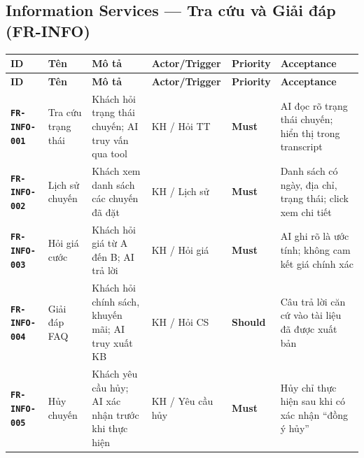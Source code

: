 \documentclass[12pt,a4paper]{article}
\newcommand{\reqid}[1]{\texttt{\textbf{\color{AloBlue}#1}}}
\newcommand{\musthave}{\colorbox{PrioMust}{\small\textbf{Must}}}
\newcommand{\shouldhave}{\colorbox{PrioShould}{\small\textbf{Should}}}
\begin{document}
\subsection{Information Services --- Tra cứu và Giải đáp (FR-INFO)}
\begin{longtable}{L{2.2cm} L{2.2cm} L{3.8cm} L{2.8cm} C{1.5cm} L{3cm}}
  \toprule{}\textbf{ID}&\textbf{Tên}&\textbf{Mô tả}&\textbf{Actor/Trigger}&\textbf{Priority}&\textbf{Acceptance}\\
  \midrule\endfirsthead\toprule{}\textbf{ID}&\textbf{Tên}&\textbf{Mô tả}&\textbf{Actor/Trigger}&\textbf{Priority}&\textbf{Acceptance}\\\midrule\endhead\bottomrule\endlastfoot
  \reqid{FR-INFO-001} & Tra cứu trạng thái & Khách hỏi trạng thái chuyến; AI truy vấn qua tool & KH / Hỏi TT & \musthave & AI đọc rõ trạng thái chuyến; hiển thị trong transcript \\
  \reqid{FR-INFO-002} & Lịch sử chuyến & Khách xem danh sách các chuyến đã đặt & KH / Lịch sử & \musthave & Danh sách có ngày, địa chỉ, trạng thái; click xem chi tiết \\
  \reqid{FR-INFO-003} & Hỏi giá cước & Khách hỏi giá từ A đến B; AI trả lời & KH / Hỏi giá & \musthave & AI ghi rõ là ước tính; không cam kết giá chính xác \\
  \reqid{FR-INFO-004} & Giải đáp FAQ & Khách hỏi chính sách, khuyến mãi; AI truy xuất KB & KH / Hỏi CS & \shouldhave & Câu trả lời căn cứ vào tài liệu đã được xuất bản \\
  \reqid{FR-INFO-005} & Hủy chuyến & Khách yêu cầu hủy; AI xác nhận trước khi thực hiện & KH / Yêu cầu hủy & \musthave & Hủy chỉ thực hiện sau khi có xác nhận ``đồng ý hủy'' \\
\end{longtable}
\end{document}
